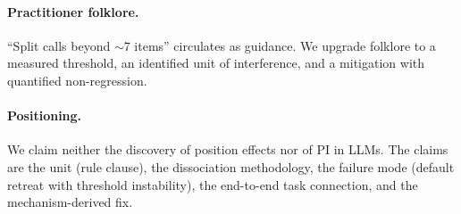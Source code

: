 \paragraph{Practitioner folklore.}
``Split calls beyond $\sim$7 items'' circulates as guidance. We upgrade folklore to a measured threshold, an
identified unit of interference, and a mitigation with quantified non-regression.

\paragraph{Positioning.}
We claim neither the discovery of position effects nor of PI in LLMs. The claims are the unit (rule clause),
the dissociation methodology, the failure mode (default retreat with threshold instability), the end-to-end
task connection, and the mechanism-derived fix.
